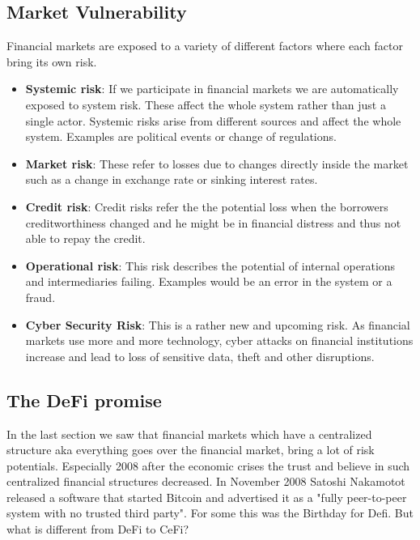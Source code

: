 \documentclass{article}
\begin{document}
\subsection{Market Vulnerability} 
Financial markets are exposed to a variety of different factors where each factor bring its own risk.
\begin{itemize}
    \item \textbf{Systemic risk}: If we participate in financial markets we are automatically exposed to system risk. These affect the whole system rather than just a single actor. Systemic risks arise from different sources and affect the whole system. Examples are political events or change of regulations.
    \item \textbf{Market risk}:  These refer to losses due to changes directly inside the market such as a change in exchange rate or sinking  interest rates. 
    
     \item \textbf{Credit risk}:  Credit risks refer the the potential loss when the borrowers creditworthiness changed and he might be in financial distress and thus not able to repay the credit.
    \item \textbf{Operational risk}:  This risk describes the potential of internal operations and intermediaries failing. Examples would be an error in the system or a fraud.
    \item \textbf{Cyber Security Risk}: This is a rather new and upcoming risk. As financial markets use more and more technology, cyber attacks on financial institutions increase and lead to loss of sensitive data, theft and other disruptions. 

\end{itemize}
\subsection{The DeFi promise } 
In the last section we saw that financial markets which have a centralized structure aka everything goes over the financial market, bring a lot of risk potentials. Especially 2008 after the economic crises the trust and believe in such centralized financial structures decreased. In November 2008 Satoshi Nakamotot released a software that started Bitcoin and advertised it as a "fully peer-to-peer system with no trusted third party". For some this was the Birthday for Defi. But what is different from DeFi to CeFi?
\end{document}
